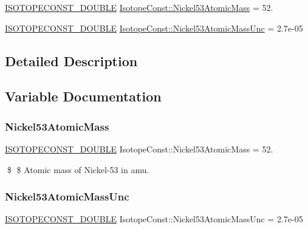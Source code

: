 \begin{DoxyCompactItemize}
\item 
\mbox{\hyperlink{group___isotope_const-_macros_ga8f45a7272ce02c0b4c65c44636ed719a}{I\+S\+O\+T\+O\+P\+E\+C\+O\+N\+S\+T\+\_\+\+D\+O\+U\+B\+LE}} \mbox{\hyperlink{group___isotope_const-_nickel-_ni53_ga902b46d43c81a034d4c53ff996409fa9}{Isotope\+Const\+::\+Nickel53\+Atomic\+Mass}} = 52.
\item 
\mbox{\hyperlink{group___isotope_const-_macros_ga8f45a7272ce02c0b4c65c44636ed719a}{I\+S\+O\+T\+O\+P\+E\+C\+O\+N\+S\+T\+\_\+\+D\+O\+U\+B\+LE}} \mbox{\hyperlink{group___isotope_const-_nickel-_ni53_gab51c050380bda311e3c9f44944497ccf}{Isotope\+Const\+::\+Nickel53\+Atomic\+Mass\+Unc}} = 2.\+7e-\/05
\end{DoxyCompactItemize}


\subsection{Detailed Description}


\subsection{Variable Documentation}
\mbox{\label{group___isotope_const-_nickel-_ni53_ga902b46d43c81a034d4c53ff996409fa9}} 
\subsubsection{\texorpdfstring{Nickel53\+Atomic\+Mass}{Nickel53AtomicMass}}
{\footnotesize\ttfamily \mbox{\hyperlink{group___isotope_const-_macros_ga8f45a7272ce02c0b4c65c44636ed719a}{I\+S\+O\+T\+O\+P\+E\+C\+O\+N\+S\+T\+\_\+\+D\+O\+U\+B\+LE}} Isotope\+Const\+::\+Nickel53\+Atomic\+Mass = 52.}

\$ \$ Atomic mass of Nickel-\/53 in amu. \mbox{\label{group___isotope_const-_nickel-_ni53_gab51c050380bda311e3c9f44944497ccf}} 
\subsubsection{\texorpdfstring{Nickel53\+Atomic\+Mass\+Unc}{Nickel53AtomicMassUnc}}
{\footnotesize\ttfamily \mbox{\hyperlink{group___isotope_const-_macros_ga8f45a7272ce02c0b4c65c44636ed719a}{I\+S\+O\+T\+O\+P\+E\+C\+O\+N\+S\+T\+\_\+\+D\+O\+U\+B\+LE}} Isotope\+Const\+::\+Nickel53\+Atomic\+Mass\+Unc = 2.\+7e-\/05}

